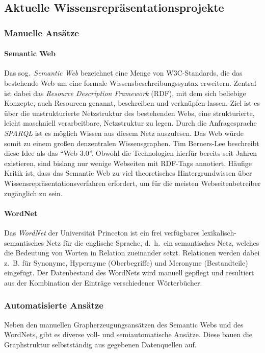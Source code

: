 \subsection{Aktuelle Wissensrepräsentationsprojekte}
\label{sec:related:kr:today}

\subsubsection{Manuelle Ansätze}

\paragraph{Semantic Web}
Das sog.~\textit{Semantic Web} bezeichnet eine Menge von W3C-Standards, die das bestehende Web um eine formale Wissensbeschreibungssyntax erweitern.
Zentral ist dabei das \textit{Resource Description Framework} (RDF), mit dem sich beliebige Konzepte, auch Resourcen genannt, beschreiben und verknüpfen lassen.
Ziel ist es über die unstrukturierte Netzstruktur des bestehenden Webs, eine strukturierte, leicht maschniell verarbeitbare, Netzstruktur zu legen.
Durch die Anfragesprache \textit{SPARQL} ist es möglich Wissen aus diesem Netz auszulesen.
Das Web würde somit zu einem großen denzentralen Wissensgraphen.
Tim Berners-Lee beschreibt diese Idee als das ``Web 3.0''.
Obwohl die Technologien hierfür bereits seit Jahren existieren, sind bislang nur wenige Webseiten mit RDF-Tags annotiert.
Häufige Kritik ist, dass das Semantic Web zu viel theoretisches Hintergrundwissen über Wissensrepräsentationsverfahren erfordert, um für die meisten Webseitenbetreiber zugänglich zu sein.

\paragraph{WordNet}
Das \textit{WordNet} der Universität Princeton ist ein frei verfügbares lexikalisch-semantisches Netz für die englische Sprache, d.~h.\ ein semantisches Netz, welches die Bedeutung von Worten in Relation zueinander setzt.
Relationen werden dabei z.~B. für Synonyme, Hypernyme (Oberbegriffe) und Meronyme (Bestandteile) eingefügt.
Der Datenbestand des WordNets wird manuell gepflegt und resultiert aus der Kombination der Einträge verschiedener Wörterbücher.

\subsubsection{Automatisierte Ansätze}
Neben den manuellen Grapherzeugungsansätzen des Semantic Webs und des WordNets, gibt es diverse voll- und semiautomatische Ansätze.
Diese bauen die Graphstruktur selbstständig aus gegebenen Datenquellen auf.

